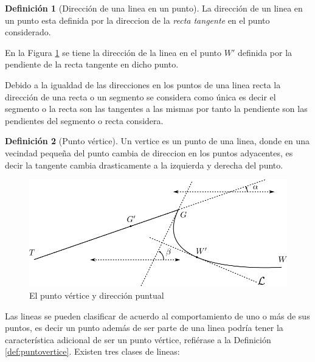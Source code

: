\documentclass[
  16pt,
]{krantz}
\theoremstyle{definition}
\newtheorem{definition}{Definición}[chapter]
\theoremstyle{definition}
\theoremstyle{definition}
\theoremstyle{definition}
\theoremstyle{remark}
\begin{document}
\begin{definition}[Dirección de una linea en un punto]
\protect\hypertarget{def:direccion}{}{\label{def:direccion} {} }La dirección de un linea en un punto esta definida por la direccion de la \emph{recta tangente} en el punto considerado.
\end{definition}

En la Figura \ref{fig:tangente} se tiene la dirección de la linea en el punto \(W'\) definida por la pendiente de la recta tangente en dicho punto.

Debido a la igualdad de las direcciones en los puntos de una linea recta la dirección de una recta o un segmento se considera como única es decir el segmento o la recta son las tangentes a las mismas por tanto la pendiente son las pendientes del segmento o recta considera.

\begin{definition}[Punto vértice]
\protect\hypertarget{def:puntovertice}{}{\label{def:puntovertice} {} }Un vertice es un punto de una linea, donde en una vecindad pequeña del punto cambia de direccion en los puntos adyacentes, es decir la tangente cambia drasticamente a la izquierda y derecha del punto.
\end{definition}

\begin{figure}[!ht]

{\centering \includegraphics{tangente} 

}

\caption{El punto vértice y dirección puntual}\label{fig:tangente}
\end{figure}

Las lineas se pueden clasificar de acuerdo al comportamiento de uno o más de sus puntos, es decir un punto además de ser parte de una linea podría tener la característica adicional de ser un punto vértice, refiérase a la Definición \ref{def:puntovertice}. Existen tres clases de lineas:
\end{document}
